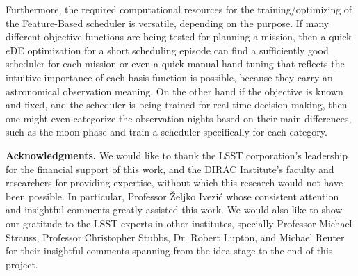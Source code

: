 \documentclass[11pt]{article}
\theoremstyle{definition}
\begin{document}
Furthermore, the required computational resources for the training/optimizing of the Feature-Based scheduler is versatile, depending on the purpose. If many different objective functions are being tested for planning a mission, then a quick $e$DE optimization for a short scheduling episode can find a sufficiently good scheduler for each mission or even a quick manual hand tuning that reflects the intuitive importance of each basis function is possible, because they carry an astronomical observation meaning. On the other hand if the objective is known and fixed, and the scheduler is being trained for real-time decision making, then one might even categorize the observation nights based on their main differences, such as the moon-phase and train a scheduler specifically for each category. 


\textbf{Acknowledgments.} We would like to thank the LSST corporation's leadership for the financial support of this work, and the DIRAC Institute's faculty and researchers for providing expertise, without which this research would not have been possible. In particular, Professor \v{Z}eljko Ivezi\'{c} whose consistent attention and insightful comments greatly assisted this work. We would also like to show our gratitude to the LSST experts in other institutes, specially Professor Michael Strauss, Professor Christopher Stubbs, Dr. Robert Lupton, and Michael Reuter for their insightful comments spanning from the idea stage to the end of this project.



%

%
\end{document}

